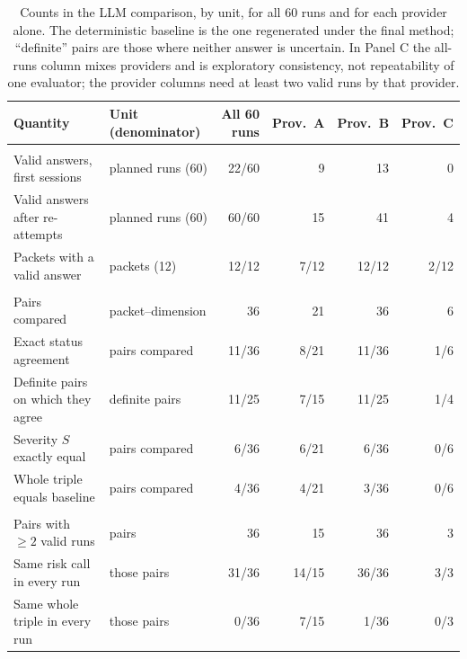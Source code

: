 \begin{table}[H]
\centering\footnotesize\setlength{\tabcolsep}{3pt}
\caption{Counts in the LLM comparison, by unit, for all 60 runs and for each provider alone. The deterministic baseline is the one regenerated under the final method; ``definite'' pairs are those where neither answer is uncertain. In Panel C the all-runs column mixes providers and is exploratory consistency, not repeatability of one evaluator; the provider columns need at least two valid runs by that provider.}\label{tab:l2denom}
\begin{tabularx}{\textwidth}{|>{\raggedright\arraybackslash}p{4.0cm}|>{\raggedright\arraybackslash}p{2.4cm}|R|R|R|R|}
\hline
\textbf{Quantity} & \textbf{Unit (denominator)} & \textbf{All 60 runs} & \textbf{Prov.\ A} & \textbf{Prov.\ B} & \textbf{Prov.\ C}\\
\hline
{}\\ \hline
Valid answers, first sessions & planned runs (60) & 22/60 & 9 & 13 & 0\\ \hline
Valid answers after re-attempts & planned runs (60) & 60/60 & 15 & 41 & 4\\ \hline
Packets with a valid answer & packets (12) & 12/12 & 7/12 & 12/12 & 2/12\\
\hline
{}\\ \hline
Pairs compared & packet--dimension & 36 & 21 & 36 & 6\\ \hline
Exact status agreement & pairs compared & 11/36 & 8/21 & 11/36 & 1/6\\ \hline
Definite pairs on which they agree & definite pairs & 11/25 & 7/15 & 11/25 & 1/4\\ \hline
Severity $S$ exactly equal & pairs compared & 6/36 & 6/21 & 6/36 & 0/6\\ \hline
Whole triple equals baseline & pairs compared & 4/36 & 4/21 & 3/36 & 0/6\\
\hline
{}\\ \hline
Pairs with $\ge2$ valid runs & pairs & 36 & 15 & 36 & 3\\ \hline
Same risk call in every run & those pairs & 31/36 & 14/15 & 36/36 & 3/3\\ \hline
Same whole triple in every run & those pairs & 0/36 & 7/15 & 1/36 & 0/3\\
\hline
\end{tabularx}
\end{table}

